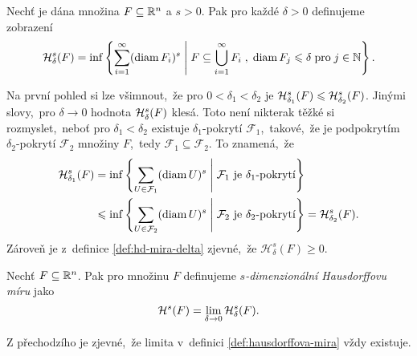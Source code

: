 \begin{definition}\label{def:hd-mira-delta}
    Nechť je dána množina $F\subseteq\R^n$ a $s>0$. Pak pro každé $\delta>0$ definujeme zobrazení
    \[\hausdorffdeltameasure{s}{\delta}(F)=\inf\set{\sum_{i=1}^{\infty}(\diam{F_i})^s\;\middle|\;F\subseteq\bigcup_{i=1}^\infty F_i\;,\;\diam{F_j}\leqslant\delta\;\text{pro}\;j\in\N}.\]
\end{definition}
Na první pohled si lze všimnout,~že pro $0<\delta_1<\delta_2$ je $\hausdorffdeltameasure{s}{\delta_1}(F)\leqslant\hausdorffdeltameasure{s}{\delta_2}(F)$. Jinými slovy,~pro $\delta\to 0$ hodnota $\hausdorffdeltameasure{s}{\delta}(F)$ klesá. Toto není nikterak těžké si rozmyslet,~neboť pro $\delta_1<\delta_2$ existuje $\delta_1$-pokrytí $\mathcal{F}_1$,~takové,~že je podpokrytím $\delta_2$-pokrytí $\mathcal{F}_2$ množiny $F$,~tedy $\mathcal{F}_1\subseteq\mathcal{F}_2$. To znamená,~že
\begin{align*}
    \hausdorffdeltameasure{s}{\delta_1}(F)&=\inf\set{\sum_{U\in\mathcal{F}_1}(\diam{U})^s\;\middle|\;\text{$\mathcal{F}_1$ je $\delta_1$-pokrytí}}\\
    &\leqslant\inf\set{\sum_{U\in\mathcal{F}_2}(\diam{U})^s\;\middle|\;\text{$\mathcal{F}_2$ je $\delta_2$-pokrytí}}=\hausdorffdeltameasure{s}{\delta_2}(F).
\end{align*}
Zároveň je z~definice \ref{def:hd-mira-delta} zjevné,~že $\mathcal{H}_\delta^s(F)\geqslant 0$.
\begin{definition}\label{def:hausdorffova-mira}
    Nechť $F\subseteq\R^n$. Pak pro množinu $F$ definujeme \emph{$s$-dimenzionální Hausdorffovu míru} jako
    \[\hausdorffmeasure{s}(F)=\lim_{\delta\to 0}\hausdorffdeltameasure{s}{\delta}(F).\]
\end{definition}
Z přechodzího je zjevné,~že limita v~definici \ref{def:hausdorffova-mira} vždy existuje.

